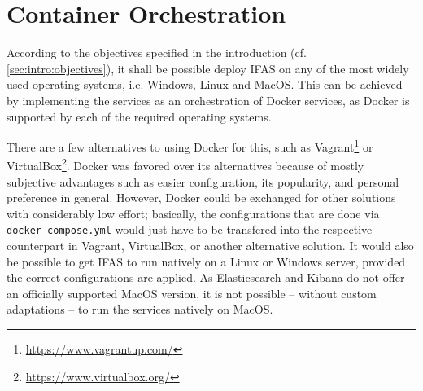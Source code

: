 \section{Container Orchestration}

According to the objectives specified in the introduction (cf. \cref{sec:intro:objectives}), it shall be possible deploy \ac{IFAS} on any of the most widely used operating systems, i.e. Windows, Linux and MacOS.
This can be achieved by implementing the services as an orchestration of Docker services, as Docker is supported by each of the required operating systems.

There are a few alternatives to using Docker for this, such as Vagrant\footnote{\url{https://www.vagrantup.com/}} or VirtualBox\footnote{\url{https://www.virtualbox.org/}}.
Docker was favored  over its alternatives because of mostly subjective advantages such as easier configuration, its popularity, and personal preference in general.
However, Docker could be exchanged for other solutions with considerably low effort; basically, the configurations that are done via \texttt{docker-compose.yml} would just have to be transfered into the respective counterpart in Vagrant, VirtualBox, or another alternative solution.
It would also be possible to get \ac{IFAS} to run natively on a Linux or Windows server, provided the correct configurations are applied.
As Elasticsearch and Kibana do not offer an officially supported MacOS version, it is not possible -- without custom adaptations -- to run the services natively on MacOS.
